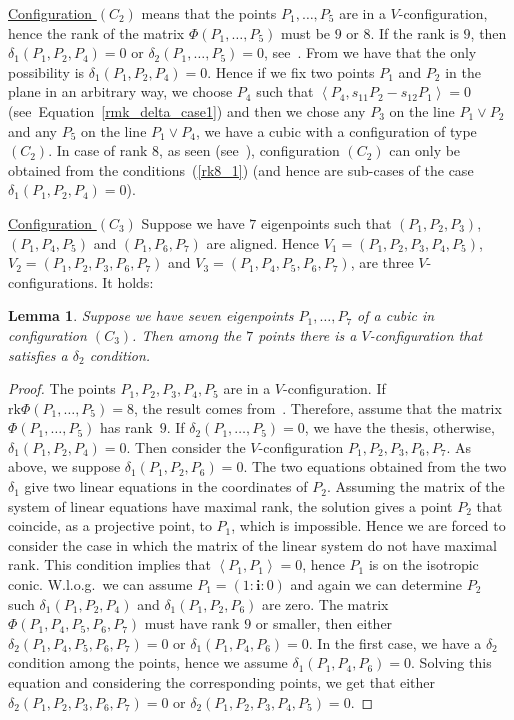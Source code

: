 \documentclass{amsart}
\theoremstyle{plain}
\newtheorem{lemma}{Lemma}[section]
\theoremstyle{definition}
\newcommand{\scl}[2]{\left\langle {#1}, {#2} \right\rangle}
\newcommand{\iii}{\textbf{i}}
\newcommand{\rk}{\ensuremath{\mathrm{rk}}}
\begin{document}
\underline{Configuration $(C_2)$} means that the points
$P_1, \dots, P_5$ are in a
$V$-configuration, hence the rank of the matrix $\Phi(P_1, \dots, P_5)$
must be $9$ or $8$. If the rank is $9$, then $\delta_1(P_1, P_2, P_4) = 0$
or $\delta_2(P_1, \dots, P_5) = 0$, see~.
From  we have that the only possibility
is $\delta_1(P_1, P_2, P_4) = 0$. Hence if we fix two points $P_1$ and $P_2$
in the plane in an arbitrary way, we choose $P_4$ such that
$\scl{P_4}{s_{11}P_2-s_{12}P_1}=0$
(see~Equation~\eqref{rmk_delta_case1}) and then we chose any $P_3$
on the line $P_1\vee P_2$ and any $P_5$ on the line $P_1\vee P_4$, we have a cubic
with a configuration of type $(C_2)$. In case of rank $8$, as seen
(see~),
configuration $(C_2)$ can only be
obtained from the conditions~(\ref{rk8_1}) (and hence are sub-cases
of the case $\delta_1(P_1, P_2, P_4)=0$).

\underline{Configuration $(C_3)$} Suppose we have $7$ eigenpoints such that
$(P_1, P_2, P_3)$, $(P_1, P_4, P_5)$ and $(P_1, P_6, P_7)$ are
aligned. Hence
$V_1 = (P_1, P_2, P_3, P_4, P_5)$, $V_2 = (P_1, P_2, P_3, P_6, P_7)$ and
$V_3 = (P_1, P_4, P_5, P_6, P_7)$, are three $V$-configurations. It holds:

\begin{lemma}
\label{no_delta1_delta1} Suppose we have seven eigenpoints $P_1, \dots, P_7$
of a cubic in configuration $(C_3)$. Then among the $7$ points there is a
$V$-configuration that satisfies a $\delta_2$ condition.
\end{lemma}
\begin{proof}
The points $P_1, P_2, P_3, P_4, P_5$ are in a $V$-configuration. If
$\rk \Phi(P_1, \dots, P_5) = 8$, the result comes from~.
Therefore, assume that the matrix $\Phi(P_1, \dots, P_5)$ has
rank~$9$. If
$\delta_2(P_1, \dots, P_5) = 0$, we have the thesis, otherwise,
$\delta_1(P_1, P_2, P_4) = 0$. Then consider the $V$-configuration
$P_1, P_2, P_3, P_6, P_7$. As above, we suppose $\delta_1(P_1, P_2, P_6) = 0$.
The two equations obtained from the two $\delta_1$ give two
linear equations in the coordinates
of $P_2$. Assuming the matrix of the system of linear equations have
maximal rank, the solution gives a point $P_2$ that coincide, as
a projective point, to $P_1$, which is impossible. Hence we are forced to
consider the
case in which the matrix of the linear system do not have maximal rank.
This condition implies that $\scl{P_1}{P_1} = 0$, hence $P_1$ is on the
isotropic conic. W.l.o.g.\ we can assume $P_1 = (1: \iii: 0)$ and again
we can determine $P_2$ such $\delta_1(P_1, P_2, P_4)$ and
$\delta_1(P_1, P_2, P_6)$ are zero. The matrix $\Phi(P_1, P_4, P_5, P_6, P_7)$
must have rank $9$ or smaller, then either
$\delta_2(P_1, P_4, P_5, P_6, P_7)=0$ or $\delta_1(P_1, P_4, P_6) = 0$. In
the first case, we have a $\delta_2$ condition among the points, hence
we assume $\delta_1(P_1, P_4, P_6) = 0$. Solving this equation and
considering the corresponding points, we get that either
$\delta_2(P_1, P_2, P_3, P_6, P_7) = 0$ or
$\delta_2(P_1, P_2, P_3, P_4, P_5) = 0$.
\end{proof}
\end{document}

